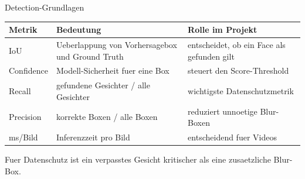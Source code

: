\begin{frame}{Detection-Grundlagen}
\small
\begin{tabularx}{\textwidth}{l X X}
\toprule
Metrik & Bedeutung & Rolle im Projekt \\
\midrule
IoU & Ueberlappung von Vorhersagebox und Ground Truth & entscheidet, ob ein Face als gefunden gilt \\
Confidence & Modell-Sicherheit fuer eine Box & steuert den Score-Threshold \\
Recall & gefundene Gesichter / alle Gesichter & wichtigste Datenschutzmetrik \\
Precision & korrekte Boxen / alle Boxen & reduziert unnoetige Blur-Boxen \\
ms/Bild & Inferenzzeit pro Bild & entscheidend fuer Videos \\
\bottomrule
\end{tabularx}
\vspace{0.8em}
\begin{mynote}[Bewertung]
Fuer Datenschutz ist ein verpasstes Gesicht kritischer als eine zusaetzliche Blur-Box.
\end{mynote}
\end{frame}
